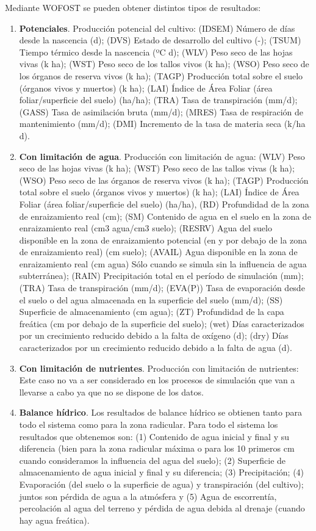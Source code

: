 \begin{enumerate}
	Mediante WOFOST se pueden obtener distintos tipos de resultados: 
	\begin{enumerate}
		\item \textbf{Potenciales}. Producción potencial del cultivo: (IDSEM) Número de días desde la nascencia (d); (DVS) Estado de desarrollo del cultivo (-); (TSUM) Tiempo térmico desde la nascencia (ºC d); (WLV) Peso seco de las hojas vivas (k ha); (WST) Peso seco de los tallos vivos (k ha); (WSO) Peso seco de los órganos de reserva vivos (k ha); (TAGP) Producción total sobre el suelo (órganos vivos y muertos) (k ha); (LAI) Índice de Área Foliar (área foliar/superficie del suelo) (ha/ha); (TRA) Tasa de transpiración (mm/d); (GASS) Tasa de asimilación bruta (mm/d); (MRES) Tasa de respiración de mantenimiento (mm/d); (DMI) Incremento de la tasa de materia seca (k/ha d). 
		\item\textbf{ Con limitación de agua}. Producción con limitación de agua: (WLV) Peso seco de las hojas vivas (k ha); (WST) Peso seco de las tallos vivas (k ha); (WSO) Peso seco de las órganos de reserva vivos (k ha); (TAGP) Producción total sobre el suelo (órganos vivos y muertos) (k ha); (LAI) Índice de Área Foliar (área foliar/superficie del suelo) (ha/ha), (RD) Profundidad de la zona de enraizamiento real (cm); (SM) Contenido de agua en el suelo en la zona de enraizamiento real (cm3 agua/cm3 suelo); (RESRV) Agua del suelo disponible en la zona de enraizamiento potencial (en y por debajo de la zona de enraizamiento real) (cm suelo); (AVAIL) Agua disponible en la zona de enraizamiento real (cm agua) Sólo cuando se simula sin la influencia de agua subterránea); (RAIN) Precipitación total en el período de simulación (mm); (TRA) Tasa de transpiración (mm/d); (EVA(P)) Tasa de evaporación desde el suelo o del agua almacenada en la superficie del suelo (mm/d); (SS) Superficie de almacenamiento (cm agua); (ZT) Profundidad de la capa freática (cm por debajo de la superficie del suelo); (wet) Días caracterizados por un crecimiento reducido debido a la falta de oxígeno (d); (dry) Días caracterizados por un crecimiento reducido debido a la falta de agua (d). 
		\item\textbf{ Con limitación de nutrientes}. Producción con limitación de nutrientes: Este caso no va a ser considerado en los procesos de simulación que van a llevarse a cabo ya que no se dispone de los datos. 
		\item\textbf{ Balance hídrico}. Los resultados de balance hídrico se obtienen tanto para todo el sistema como para la zona radicular. Para todo el sistema los resultados que obtenemos son: (1) Contenido de agua inicial y final y su diferencia (bien para la zona radicular máxima o para los 10 primeros cm cuando consideramos la influencia del agua del suelo); (2) Superficie de almacenamiento de agua inicial y final y su diferencia; (3) Precipitación; (4) Evaporación (del suelo o la superficie de agua) y transpiración (del cultivo); juntos son pérdida de agua a la atmósfera y (5) Agua de escorrentía, percolación al agua del terreno y pérdida de agua debida al drenaje (cuando hay agua freática).
		

\end{enumerate}
\end{enumerate}
